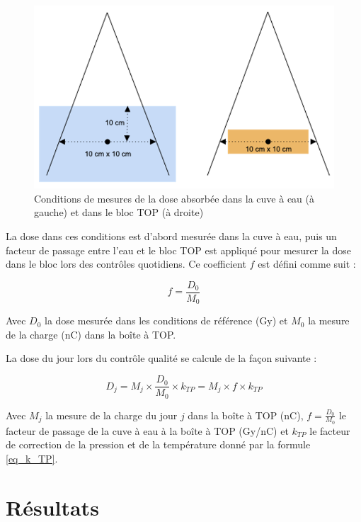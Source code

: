 \documentclass{article}
\begin{document}
\begin{figure}[h]
  \centering
  \includegraphics[scale=0.8]{figures/conditions_ref_top.png}
  \caption{Conditions de mesures de la dose absorbée dans la cuve à eau (à gauche) et dans le bloc TOP (à droite)}
  \label{fig_top}
\end{figure}

La dose dans ces conditions est d'abord mesurée dans la cuve à eau, puis un facteur de passage entre l'eau et le bloc TOP est appliqué pour mesurer la dose dans le bloc lors des contrôles quotidiens. Ce coefficient $f$ est défini comme suit :

\begin{equation}
  f = \dfrac{D_0}{M_0}
  \label{eq_facteur_top}
\end{equation}

Avec $D_0$ la dose mesurée dans les conditions de référence (Gy) et $M_0$ la mesure de la charge (nC) dans la boîte à TOP.

La dose du jour lors du contrôle qualité se calcule de la façon suivante :

\begin{equation}
  D_j = M_j \times \dfrac{D_0}{M_0} \times k_{TP} = M_j \times f \times k_{TP}
  \label{eq_top_jour}
\end{equation}

Avec $M_j$ la mesure de la charge du jour $j$ dans la boîte à TOP (nC), $f = \frac{D_0}{M_0}$ le facteur de passage de la cuve à eau à la boîte à TOP (Gy/nC) et $k_{TP}$ le facteur de correction de la pression et de la température donné par la formule \ref*{eq_k_TP}.

\clearpage
\section{Résultats}
\end{document}
